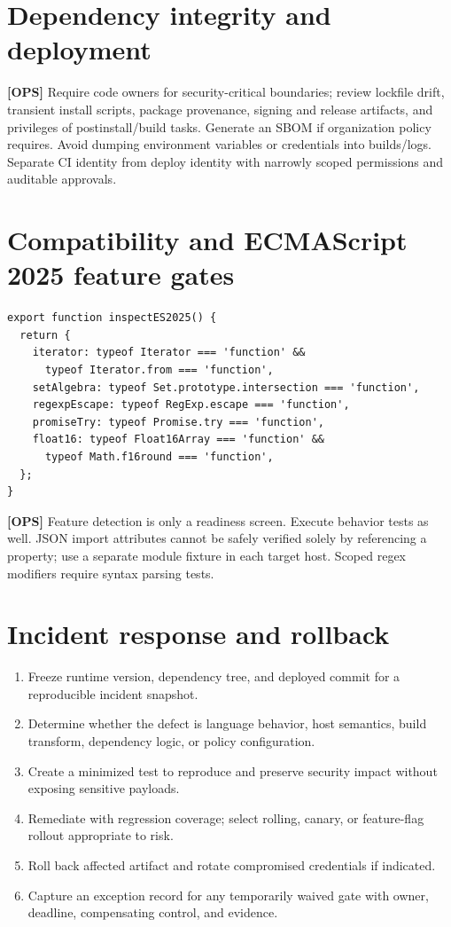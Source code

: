 \documentclass[11pt,letterpaper]{article}
\providecommand{\tightlist}{\setlength{\itemsep}{0pt}\setlength{\parskip}{0pt}}
\begin{document}
\section{Dependency integrity and deployment}\label{dependency-integrity-and-deployment}

\textbf{{[}OPS{]}} Require code owners for security-critical boundaries; review lockfile drift, transient install scripts, package provenance, signing and release artifacts, and privileges of postinstall/build tasks. Generate an SBOM if organization policy requires. Avoid dumping environment variables or credentials into builds/logs. Separate CI identity from deploy identity with narrowly scoped permissions and auditable approvals.

\section{Compatibility and ECMAScript 2025 feature gates}\label{compatibility-and-ecmascript-2025-feature-gates}

\begin{lstlisting}
export function inspectES2025() {
  return {
    iterator: typeof Iterator === 'function' &&
      typeof Iterator.from === 'function',
    setAlgebra: typeof Set.prototype.intersection === 'function',
    regexpEscape: typeof RegExp.escape === 'function',
    promiseTry: typeof Promise.try === 'function',
    float16: typeof Float16Array === 'function' &&
      typeof Math.f16round === 'function',
  };
}
\end{lstlisting}

\textbf{{[}OPS{]}} Feature detection is only a readiness screen. Execute behavior tests as well. JSON import attributes cannot be safely verified solely by referencing a property; use a separate module fixture in each target host. Scoped regex modifiers require syntax parsing tests.

\section{Incident response and rollback}\label{incident-response-and-rollback}

\begin{enumerate}
\def\labelenumi{\arabic{enumi}.}
\tightlist
\item
  Freeze runtime version, dependency tree, and deployed commit for a reproducible incident snapshot.
\item
  Determine whether the defect is language behavior, host semantics, build transform, dependency logic, or policy configuration.
\item
  Create a minimized test to reproduce and preserve security impact without exposing sensitive payloads.
\item
  Remediate with regression coverage; select rolling, canary, or feature-flag rollout appropriate to risk.
\item
  Roll back affected artifact and rotate compromised credentials if indicated.
\item
  Capture an exception record for any temporarily waived gate with owner, deadline, compensating control, and evidence.
\end{enumerate}
\end{document}
